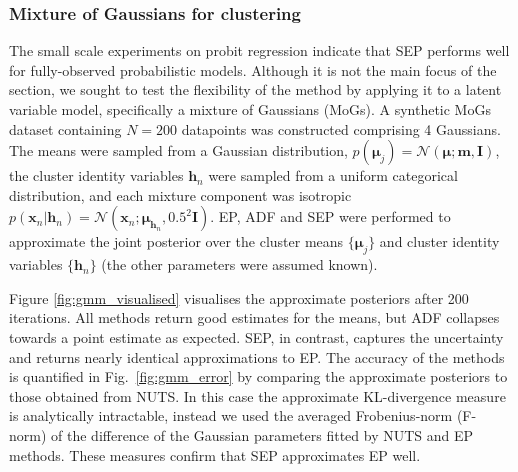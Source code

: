 \subsubsection{Mixture of Gaussians for clustering}
%
The small scale experiments on probit regression indicate that SEP performs well for fully-observed probabilistic models. Although it is not the main focus of the section, we sought to test the flexibility of the method by applying it to a latent variable model, specifically a mixture of Gaussians (MoGs). A synthetic MoGs dataset containing $N=200$ datapoints was constructed comprising 4 Gaussians. The means were sampled from a Gaussian distribution, $p(\bm{\mu}_j)= \mathcal{N}(\bm{\mu}; \bm{m}, \mathbf{I})$, the cluster identity variables $\bm{h}_n$ were sampled from a uniform categorical distribution, and each mixture component was isotropic $p(\bm{x}_n | \bm{h}_n) = \mathcal{N}(\bm{x}_n; \bm{\mu}_{\bm{h}_n}, 0.5^2 \mathbf{I})$. EP, ADF and SEP were performed to approximate the joint posterior over the cluster means $\{ \bm{\mu}_j\}$ and cluster identity variables $\{ \bm{h}_n \}$ (the other parameters were assumed known). 

Figure \ref{fig:gmm_visualised} visualises the approximate posteriors after 200 iterations. All methods return good estimates for the means, but ADF collapses towards a point estimate as expected. SEP, in contrast, captures the uncertainty and returns nearly identical approximations to EP. The accuracy of the methods is quantified in Fig.~\ref{fig:gmm_error} by comparing the approximate posteriors to those obtained from NUTS. In this case the approximate KL-divergence measure is analytically intractable, instead we used the averaged Frobenius-norm (F-norm) of the difference of the Gaussian parameters fitted by NUTS and EP methods. These measures confirm that SEP approximates EP well.

